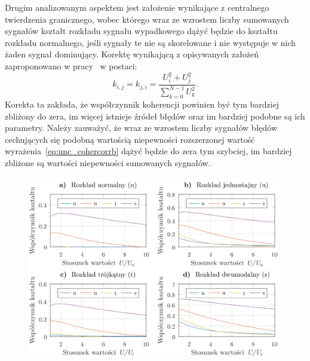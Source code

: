 Drugim analizowanym aspektem jest założenie wynikające z centralnego twierdzenia granicznego, wobec którego wraz ze wzrostem liczby sumowanych sygnałów kształt rozkładu sygnału wypadkowego dążyć będzie do kształtu rozkładu normalnego, jeśli sygnały te nie są skorelowane i nie występuje w nich żaden sygnał dominujący. Korektę wynikającą z opisywanych założeń zaproponowano w pracy~\cite{jakubiec_system} w postaci:
\begin{equation}
k_{i,j} = k_{j,i} = \frac{U_{i}^{2} + U_{j}^{2}}{\sum _{k = 0} ^{N-1} U_{k}^{2}} \label{eq:unc_cohercorrb}.
\end{equation}
Korekta ta zakłada, że współczynnik koherencji powinien być tym bardziej zbliżony do zera, im więcej istnieje źródeł błędów oraz im bardziej podobne są ich parametry. Należy zauważyć, że wraz ze wzrostem liczby sygnałów błędów cechujących się podobną wartością niepewności rozszerzonej wartość wyrażenia~\eqref{eq:unc_cohercorrb} dążyć będzie do zera tym szybciej, im bardziej zbliżone są wartości niepewności sumowanych sygnałów.

\begin{figure}[htb!]
\begin{center}
\includegraphics{obrazki/shapes}
\end{center}
\end{figure}

